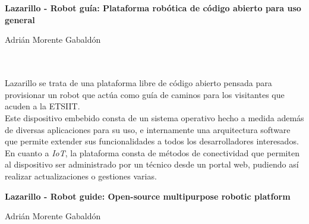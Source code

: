 \chapter*{}

\thispagestyle{empty}

\begin{center}
{\large\bfseries Lazarillo - Robot guía: Plataforma robótica de código abierto para uso general}\\
\end{center}
\begin{center}
Adrián Morente Gabaldón\\
\end{center}

\\

\vspace{0.7cm}
\\

Lazarillo se trata de una plataforma libre de código abierto pensada para provisionar un robot que actúa como guía de caminos para los visitantes que acuden a la ETSIIT.\\

Este dispositivo embebido consta de un sistema operativo hecho a medida además de diversas aplicaciones para su uso, e internamente una arquitectura software que permite extender sus funcionalidades a todos los desarrolladores interesados.\\

En cuanto a \textit{IoT}, la plataforma consta de métodos de conectividad que permiten al dispositivo ser administrado por un técnico desde un portal web, pudiendo así realizar actualizaciones o gestiones varias.
\cleardoublepage


\thispagestyle{empty}


\begin{center}
{\large\bfseries Lazarillo - Robot guide: Open-source multipurpose robotic platform}\\
\end{center}
\begin{center}
Adrián Morente Gabaldón\\
\end{center}

\\

